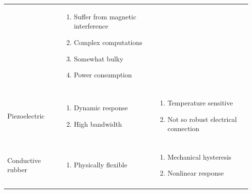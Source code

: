 \documentclass[english]{article}
\begin{document}
\begin{table}
\begin{center}
\begin{tabular}{ l l l }
 &
 
\begin{minipage}{2.5in}									
    \begin{enumerate}
   \item Suffer from magnetic interference
   \item Complex computations
   \item Somewhat bulky
   \item Power consumption
   \end{enumerate}
 \end{minipage} 
 
 \\\\\hline
 
 	   Piezoelectric		
 	   
 	   &
 	   
 	   	 \begin{minipage}{2.5in}									
    \begin{enumerate}
   \item Dynamic response
   \item High bandwidth
   \end{enumerate}
 \end{minipage}  
 
 &
 
\begin{minipage}{2.5in}									
    \begin{enumerate}
   \item Temperature sensitive
   \item Not so robust electrical connection
   \end{enumerate}
 \end{minipage} 
 
 \\\\\hline
 
 	   Conductive rubber 
 	   
 	   &
 	   
 	   \begin{minipage}{2.5in}									
    \begin{enumerate}
   \item Physically flexible
   \end{enumerate}
 \end{minipage} 
 
  &
  
\begin{minipage}{2.5in}									
    \begin{enumerate}
   \item Mechanical hysteresis
   \item Nonlinear response
   \end{enumerate}
 \end{minipage} 
 
 \\\\\hline
    \end{tabular}
 \end{center}
\end{table}
\end{document}
